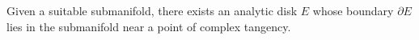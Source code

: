 
Given a suitable submanifold, there exists an analytic disk $E$ whose boundary $\partial E$ lies in the submanifold near a point of complex tangency.
